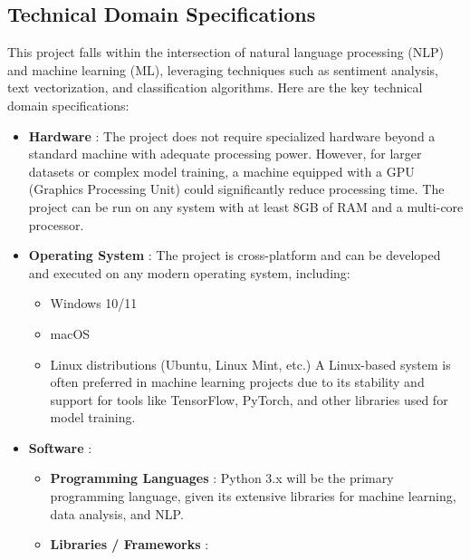 \subsection{Technical Domain Specifications}
\vspace{.1in}
This project falls within the intersection of natural language processing (NLP) and machine learning (ML), leveraging techniques such as sentiment analysis, text vectorization, and classification algorithms. Here are the key technical domain specifications:

\begin{itemize}
    
    \item \textbf{Hardware} : 
    \noindent
    The project does not require specialized hardware beyond a standard machine with adequate processing power. However, for larger datasets or complex model training, a machine equipped with a GPU (Graphics Processing Unit) could significantly reduce processing time. The project can be run on any system with at least 8GB of RAM and a multi-core processor.

    \item \textbf{Operating System} : 
    \noindent
    The project is cross-platform and can be developed and executed on any modern operating system, including:
        \begin{itemize}
            \item Windows 10/11
            \item macOS
            \item 
            \noindent
            Linux distributions (Ubuntu, Linux Mint, etc.) A Linux-based system is often preferred in machine learning projects due to its stability and support for tools like TensorFlow, PyTorch, and other libraries used for model training.
        \end{itemize}

    \item  \textbf{Software} :
    \noindent
        \begin{itemize}
            \item \textbf{Programming Languages} : 
            \noindent
            Python 3.x will be the primary programming language, given its extensive libraries for machine learning, data analysis, and NLP.

            \item \textbf{Libraries / Frameworks} :
            \noindent
                \begin{itemize}
                    

\end{itemize}
\end{itemize}
\end{itemize}
